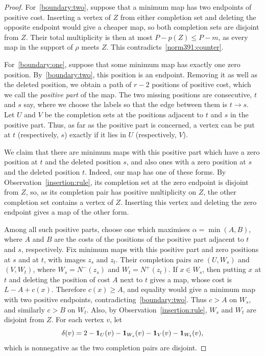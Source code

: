 \begin{proof}
For~\ref{boundary:two}, suppose that a minimum map has two endpoints of positive cost. Inserting a vertex of $Z$ from either completion set and deleting the opposite endpoint would give a cheaper map, so both completion sets are disjoint from $Z$. Their total multiplicity is then at most $P-p(Z)\le P-m$, as every map in the support of $\rho$ meets $Z$. This contradicts~\eqref{norm391:counter}.

For~\ref{boundary:one}, suppose that some minimum map has exactly one zero position. By~\ref{boundary:two}, this position is an endpoint. Removing it as well as the deleted position, we obtain a path of $r-2$ positions of positive cost, which we call the \emph{positive part} of the map. The two missing positions are consecutive, $t$ and $s$ say, where we choose the labels so that the edge between them is $t\to s$. Let $U$ and $V$ be the completion sets at the positions adjacent to $t$ and $s$ in the positive part. Thus, as far as the positive part is concerned, a vertex can be put at $t$ (respectively, $s$) exactly if it lies in $U$ (respectively, $V$).

We claim that there are minimum maps with this positive part which have a zero position at $t$ and the deleted position $s$, and also ones with a zero position at $s$ and the deleted position $t$. Indeed, our map has one of these forms. By Observation~\ref{insertion:rule}, its completion set at the zero endpoint is disjoint from $Z$, so, as its completion pair has positive multiplicity on $Z$, the other completion set contains a vertex of $Z$. Inserting this vertex and deleting the zero endpoint gives a map of the other form.

Among all such positive parts, choose one which maximises $\alpha=\min(A,B)$, where $A$ and $B$ are the costs of the positions of the positive part adjacent to $t$ and $s$, respectively. Fix minimum maps with this positive part and zero positions at $s$ and at $t$, with images $z_s$ and $z_t$. Their completion pairs are $(U,W_s)$ and $(V,W_t)$, where $W_s=N^-(z_s)$ and $W_t=N^+(z_t)$.
If $x\in W_s$, then putting $x$ at $t$ and deleting the position of cost $A$ next to $t$ gives a map, whose cost is $L-A+c(x)$. Therefore $c(x)\ge A$, and equality would give a minimum map with two positive endpoints, contradicting~\ref{boundary:two}. Thus $c>A$ on $W_s$, and similarly $c>B$ on $W_t$. Also, by Observation~\ref{insertion:rule}, $W_s$ and $W_t$ are disjoint from $Z$.
For each vertex $v$, let
\[
\delta(v)=2-\mathbf 1_U(v)-\mathbf 1_{W_s}(v)-\mathbf 1_V(v)-\mathbf 1_{W_t}(v),
\]
which is nonnegative as the two completion pairs are disjoint.


\end{proof}
